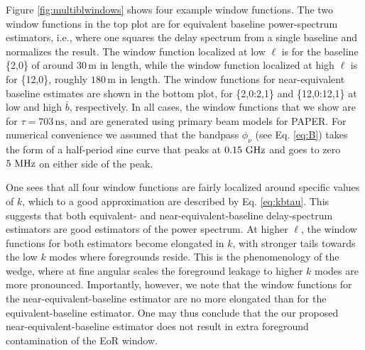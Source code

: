 \documentclass[twocolumn,apj,numberedappendix]{emulateapj}
\renewcommand\[{\begin{equation}}
\renewcommand\]{\end{equation}}
\begin{document}
Figure \ref{fig:multiblwindows} shows four example window functions. The two window functions in the top plot are for equivalent baseline power-spectrum estimators, i.e., where one squares the delay spectrum from a single baseline and normalizes the result. The window function localized at low $\ell$ is for the baseline \{2,0\} of around $30\,\textrm{m}$ in length, while the window function localized at high $\ell$ is for \{12,0\}, roughly $180\,\textrm{m}$ in length. The window functions for near-equivalent baseline estimates are shown in the bottom plot, for \{2,0:2,1\} and \{12,0:12,1\} at low and high $\bar{b}$, respectively. In all cases, the window functions that we show are for $\tau = 703\,\textrm{ns}$, and are generated using primary beam models for PAPER. For numerical convenience we assumed that the bandpass $\phi_\nu$ (see Eq. \eqref{eq:B}) takes the form of a half-period sine curve that peaks at $0.15\,\textrm{\,GHz}$ and goes to zero $5\,\textrm{\,MHz}$ on either side of the peak.

One sees that all four window functions are fairly localized around specific values of $k$, which to a good approximation are described by Eq. \eqref{eq:kbtau}. This suggests that both equivalent- and near-equivalent-baseline delay-spectrum estimators are good estimators of the power spectrum. At higher $\ell$, the window functions for both estimators become elongated in $k$, with stronger tails towards the low $k$ modes where foregrounds reside. This is the phenomenology of the wedge, where at fine angular scales the foreground leakage to higher $k$ modes are more pronounced. Importantly, however, we note that the window functions for the near-equivalent-baseline estimator are no more elongated than for the equivalent-baseline estimator. One may thus conclude that the our proposed near-equivalent-baseline estimator does not result in extra foreground contamination of the EoR window.

\end{document}
